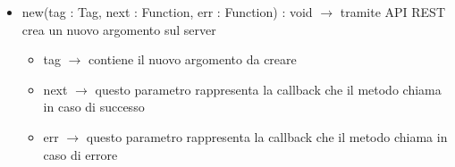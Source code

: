 \begin{description}
\begin{itemize}
	\item new(tag : Tag, next : Function, err : Function) : void $\rightarrow$ tramite API REST crea un nuovo argomento sul server\begin{itemize}
		\item tag $\rightarrow$ contiene il nuovo argomento da creare
		\item next $\rightarrow$ questo parametro rappresenta la callback che il metodo chiama in caso di successo
		\item err $\rightarrow$ questo parametro rappresenta la callback che il metodo chiama in caso di errore
	\end{itemize}
	
\end{itemize}

\end{description}

